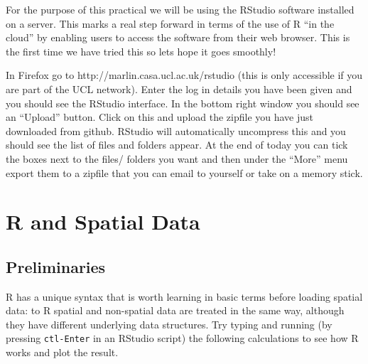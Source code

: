 \documentclass[]{article}
\begin{document}
For the purpose of this practical we will be using the RStudio software
installed on a server. This marks a real step forward in terms of the
use of R ``in the cloud'' by enabling users to access the software from
their web browser. This is the first time we have tried this so lets
hope it goes smoothly!

In Firefox go to http://marlin.casa.ucl.ac.uk/rstudio (this is only
accessible if you are part of the UCL network). Enter the log in details
you have been given and you should see the RStudio interface. In the
bottom right window you should see an ``Upload'' button. Click on this
and upload the zipfile you have just downloaded from github. RStudio
will automatically uncompress this and you should see the list of files
and folders appear. At the end of today you can tick the boxes next to
the files/ folders you want and then under the ``More'' menu export them
to a zipfile that you can email to yourself or take on a memory stick.

\section{R and Spatial Data}

\subsection{Preliminaries}

R has a unique syntax that is worth learning in basic terms before
loading spatial data: to R spatial and non-spatial data are treated in
the same way, although they have different underlying data structures.
Try typing and running (by pressing \texttt{ctl-Enter} in an RStudio
script) the following calculations to see how R works and plot the
result.
\end{document}
